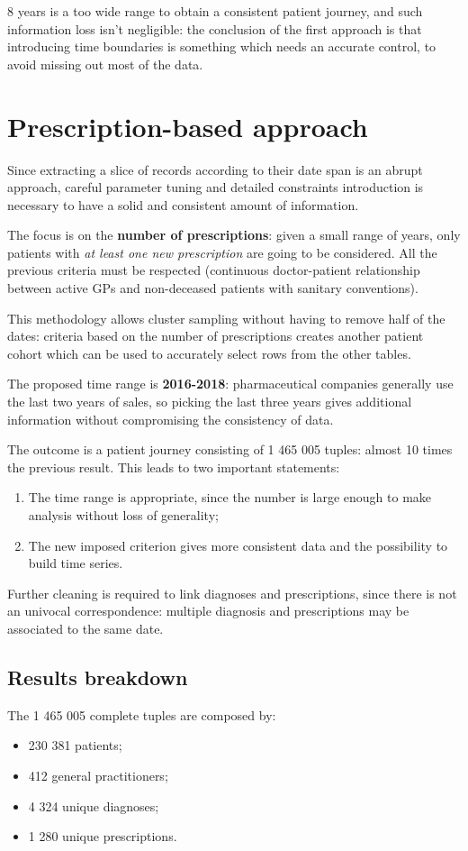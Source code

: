 8 years is a too wide range to obtain a consistent patient journey, and such information loss isn't negligible: the conclusion of the first approach is that introducing time boundaries is something which needs an accurate control, to avoid missing out most of the data.

\section{Prescription-based approach}
Since extracting a slice of records according to their date span is an abrupt approach, careful parameter tuning and detailed constraints introduction is necessary to have a solid and consistent amount of information.

The focus is on the \textbf{number of prescriptions}: given a small range of years, only patients with \textit{at least one new prescription} are going to be considered. All the previous criteria must be respected (continuous doctor-patient relationship between active GPs and non-deceased patients with sanitary conventions).

This methodology allows cluster sampling without having to remove half of the dates: criteria based on the number of prescriptions creates another patient cohort which can be used to accurately select rows from the other tables.

The proposed time range is \textbf{2016-2018}: pharmaceutical companies generally use the last two years of sales, so picking the last three years gives additional information without compromising the consistency of data.

The outcome is a patient journey consisting of 1 465 005 tuples: almost 10 times the previous result. This leads to two important statements:
\begin{enumerate}
	\item The time range is appropriate, since the number is large enough to make analysis without loss of generality;
	\item The new imposed criterion gives more consistent data and the possibility to build time series.
\end{enumerate}

Further cleaning is required to link diagnoses and prescriptions, since there is not an univocal correspondence: multiple diagnosis and prescriptions may be associated to the same date. 

\subsection{Results breakdown}
The 1 465 005 complete tuples are composed by:
\begin{itemize}
	\item 230 381 patients;
	\item 412 general practitioners;
	\item 4 324 unique diagnoses;
	\item 1 280 unique prescriptions.
\end{itemize}

